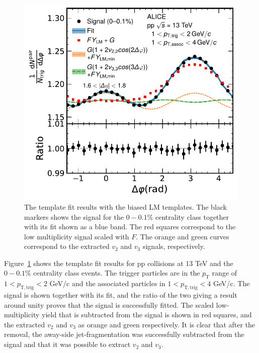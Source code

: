\begin{figure}[!t]
	\centering
	\includegraphics[width=0.8 \textwidth]{figures/Fig1_FlowExt.pdf} 
	\caption{The template fit results with the biased LM templates. The black markers shows the signal for the $0-0.1\%$ centrality class together with its fit shown as a blue band. The red squares correspond to the low multiplicity signal scaled with $F$. The orange and green curves correspond to the extracted $v_2$ and $v_3$ signals, respectively.}
	\label{fig:flowext}
\end{figure}

Figure~\ref{fig:flowext} shows the template fit results for pp collisions at 13 TeV and the $0-0.1\%$ centrality class events. The trigger particles are in the $p_\mathrm{T}$ range of $1<p_{\mathrm{T,trig}}<2$ GeV/c and the associated particles in $1<p_{\mathrm{T,trig}}<4$ GeV/c. The signal is shown together with its fit, and the ratio of the two giving a result around unity proves that the signal is successfully fitted. The scaled low-multiplicity yield that is subtracted from the signal is shown in red squares, and the extracted $v_2$ and $v_3$ as orange and green respectively. 
It is clear that after the removal, the away-side jet-fragmentation was successfully subtracted from the signal and that it was possible to extract $v_2$ and $v_3$. 

